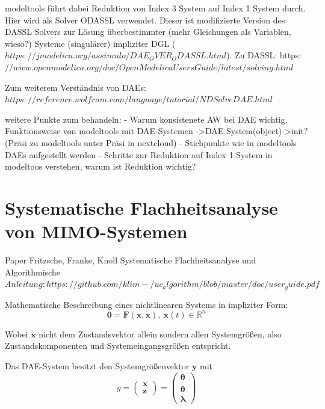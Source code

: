 modeltools führt dabei Reduktion von Index 3 System auf Index 1 System durch.
Hier wird als Solver ODASSL verwendet. Dieser ist modifizierte Version des DASSL Solvers zur Lösung überbestimmter (mehr Gleichungen als Variablen, wieso?) Systeme (singulärer) impliziter DGL ($https://jmodelica.org/assimulo/DAE_OVER_ODASSL.html$). Zu DASSL: https:$//www.openmodelica.org/doc/OpenModelicaUsersGuide/latest/solving.html$

Zum weiterem Verständnis von DAEs: $https://reference.wolfram.com/language/tutorial/NDSolveDAE.html$

weitere Punkte zum behandeln:
- Warum konsistenete AW bei DAE wichtig, Funktionsweise von modeltools mit DAE-Systemen ->DAE System(object)->init? (Präsi zu modeltools unter Präsi in nextcloud)
- Stichpunkte wie in modeltools DAEs aufgestellt werden
- Schritte zur Reduktion auf Index 1 System in modeltoos verstehen, warum ist Reduktion wichtig?

\section{Systematische Flachheitsanalyse von MIMO-Systemen}
Paper Fritzsche, Franke, Knoll Systematische Flachheitsanalyse und Algorithmische $Anleitung: https://github.com/klim-/uc_algorithm/blob/master/doc/user_guide.pdf$

Mathematische Beschreibung eines nichtlinearen Systems in impliziter Form:
\begin{equation}\label{eq:flatness_implicit_ode}
	\pmb{0} = \pmb{F}(\pmb{x}, \pmb{\dot{x}}), \ \pmb{x}(t) \in \mathbb{R}^n
\end{equation}

Wobei $\pmb{x}$ nicht dem Zustandsvektor allein sondern allen Systemgrößen, also Zustandskomponenten und Systemeingangsgrößen entspricht.

Das DAE-System besitzt den Systemgrößenvektor $\pmb{y}$ mit
\begin{equation}
	y
	=
	\begin{pmatrix}
		\pmb{x} \\
		\hline
		\pmb{z}
	\end{pmatrix}
	=
	\begin{pmatrix}
		\pmb{\theta} \\
		\pmb{\dot{\theta}} \\
		\hline
		\pmb{\lambda}
	\end{pmatrix}
\end{equation}

